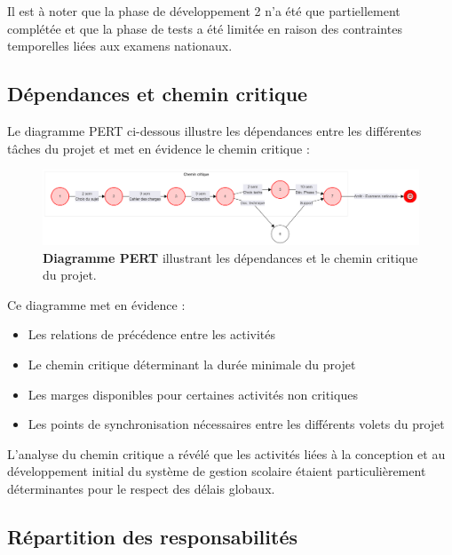 Il est à noter que la phase de développement 2 n'a été que partiellement complétée et que la phase de tests a été limitée en raison des contraintes temporelles liées aux examens nationaux.

\subsection{Dépendances et chemin critique}

Le diagramme PERT ci-dessous illustre les dépendances entre les différentes tâches du projet et met en évidence le chemin critique :

\begin{figure}[H]
  \centering
  \includegraphics[width=1.0\textwidth,keepaspectratio]{pfe-pics/diagrames/Mermaid Chart - Create complex, visual diagrams with text. A smarter way of creating diagrams.-2025-06-10-203658.png}
  \caption{\textbf{Diagramme PERT} illustrant les dépendances et le chemin critique du projet.}
  \label{fig:pert_diagram}
\end{figure}

Ce diagramme met en évidence :

\begin{itemize}
  \item Les relations de précédence entre les activités
  
  \item Le chemin critique déterminant la durée minimale du projet
  
  \item Les marges disponibles pour certaines activités non critiques
  
  \item Les points de synchronisation nécessaires entre les différents volets du projet
\end{itemize}

L'analyse du chemin critique a révélé que les activités liées à la conception et au développement initial du système de gestion scolaire étaient particulièrement déterminantes pour le respect des délais globaux.

\subsection{Répartition des responsabilités}

